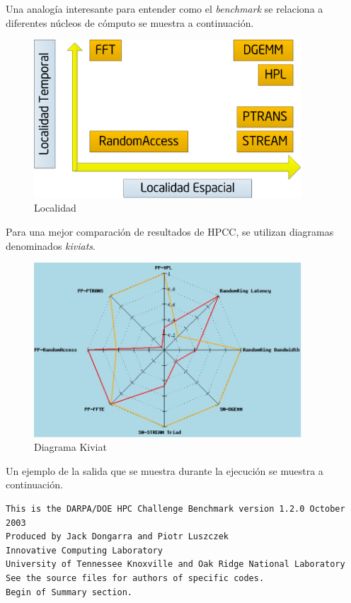 \documentclass[a4paper]{report}
\begin{document}
\bigskip

Una analog\'ia interesante para entender como el {\it benchmark} se relaciona a diferentes n\'ucleos de c\'omputo
se muestra a continuaci\'on.

\bigskip

\begin{figure}[H]
\begin{center}
\includegraphics[width=10cm]{locality.png}
\caption{Localidad}
\end{center}
\end{figure}

\bigskip

Para una mejor comparaci\'on de resultados de HPCC, se utilizan diagramas denominados {\it kiviats}.

\begin{figure}[H]
\begin{center}
\includegraphics[width=10cm]{kiviat.png}
\caption{Diagrama Kiviat}
\end{center}
\end{figure}

Un ejemplo de la salida que se muestra durante la ejecuci\'on se muestra a continuaci\'on.

\begin{verbatim}
This is the DARPA/DOE HPC Challenge Benchmark version 1.2.0 October 2003
Produced by Jack Dongarra and Piotr Luszczek
Innovative Computing Laboratory
University of Tennessee Knoxville and Oak Ridge National Laboratory
See the source files for authors of specific codes.
Begin of Summary section.
\end{verbatim}
\end{document}

